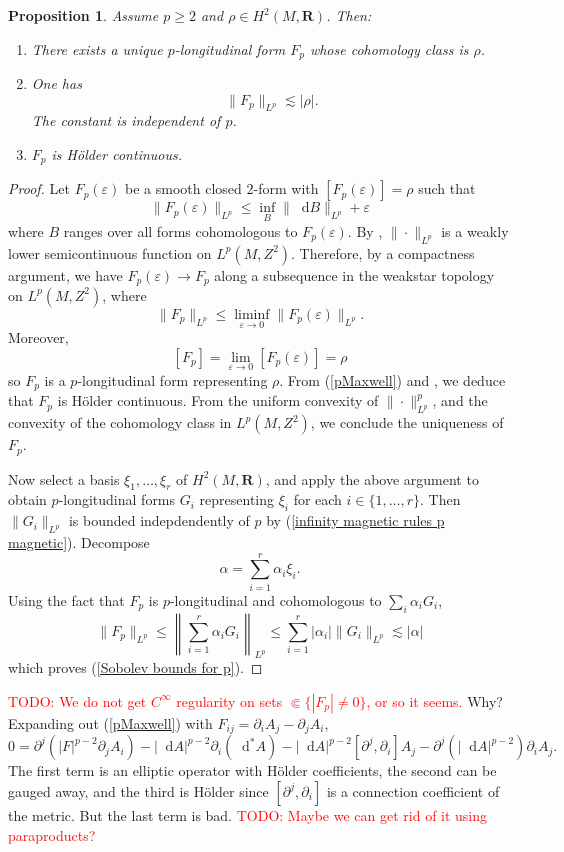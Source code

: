 \documentclass[reqno,11pt]{amsart}
\newcommand{\RR}{\mathbf{R}}
\newcommand*\dif{\mathop{}\!\mathrm{d}}
\newtheorem{proposition}[theorem]{Proposition}
\theoremstyle{definition}
\numberwithin{equation}{section}
\newcommand\todo[1]{\textcolor{red}{TODO: #1}}
\begin{document}
\begin{proposition}\label{existence for p}
Assume $p \geq 2$ and $\rho \in H^2(M, \RR)$.
Then:
\begin{enumerate}
\item There exists a unique $p$-longitudinal form $F_p$ whose cohomology class is $\rho$.
\item One has
\begin{equation}\label{Sobolev bounds for p}
	\|F_p\|_{L^p} \lesssim |\rho|.
\end{equation}
The constant is independent of $p$.
\item $F_p$ is H\"older continuous.
\end{enumerate}
\end{proposition}
\begin{proof}
Let $F_p(\varepsilon)$ be a smooth closed $2$-form with $[F_p(\varepsilon)] = \rho$ such that
$$\|F_p(\varepsilon)\|_{L^p} \leq \inf_B \|\dif B\|_{L^p} + \varepsilon$$
where $B$ ranges over all forms cohomologous to $F_p(\varepsilon)$.
By \cite[\S8.2.2]{evans2010partial}, $\|\cdot\|_{L^p}$ is a weakly lower semicontinuous function on $L^p(M, Z^2)$.
Therefore, by a compactness argument, we have $F_p(\varepsilon) \to F_p$ along a subsequence in the weakstar topology on $L^p(M, Z^2)$, where
$$\|F_p\|_{L^p} \leq \liminf_{\varepsilon \to 0} \|F_p(\varepsilon)\|_{L^p}.$$
Moreover,
$$[F_p] = \lim_{\varepsilon \to 0} [F_p(\varepsilon)] = \rho$$
so $F_p$ is a $p$-longitudinal form representing $\rho$.
From (\ref{pMaxwell}) and \cite{Uhlenbeck77}, we deduce that $F_p$ is H\"older continuous.
From the uniform convexity of $\|\cdot\|_{L^p}^p$, and the convexity of the cohomology class in $L^p(M, Z^2)$, we conclude the uniqueness of $F_p$.

Now select a basis $\xi_1, \dots, \xi_r$ of $H^2(M, \RR)$, and apply the above argument to obtain $p$-longitudinal forms $G_i$ representing $\xi_i$ for each $i \in \{1, \dots, r\}$.
Then $\|G_i\|_{L^p}$ is bounded indepdendently of $p$ by (\ref{infinity magnetic rules p magnetic}).
Decompose
$$\alpha = \sum_{i=1}^r \alpha_i \xi_i.$$
Using the fact that $F_p$ is $p$-longitudinal and cohomologous to $\sum_i \alpha_i G_i$,
$$\|F_p\|_{L^p} \leq \left\|\sum_{i=1}^r \alpha_i G_i\right\|_{L^p} \leq \sum_{i=1}^r |\alpha_i| \|G_i\|_{L^p} \lesssim |\alpha|$$
which proves (\ref{Sobolev bounds for p}).
\end{proof}

\todo{We do not get $C^\infty$ regularity on sets $\Subset \{|F_p| \neq 0\}$, or so it seems.}
Why?
Expanding out (\ref{pMaxwell}) with $F_{ij} = \partial_i A_j - \partial_j A_i$,
$$0 = \partial^j(|F|^{p - 2} \partial_j A_i) - |\dif A|^{p - 2} \partial_i (\dif^* A) - |\dif A|^{p - 2} [\partial^j, \partial_i] A_j - \partial^j(|\dif A|^{p - 2}) \partial_i A_j.$$
The first term is an elliptic operator with H\"older coefficients, the second can be gauged away, and the third is H\"older since $[\partial^j, \partial_i]$ is a connection coefficient of the metric.
But the last term is bad.
\todo{Maybe we can get rid of it using paraproducts?}
\end{document}
